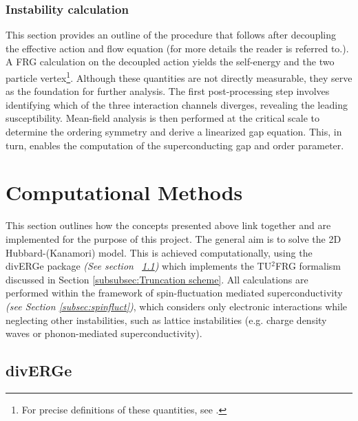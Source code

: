 \documentclass[12pt]{article}
\begin{document}
\medskip





\subsubsection{Instability calculation}

This section provides an outline of the procedure that follows after decoupling the effective action and flow equation (for more details the reader is referred to\cite{profe2023functional}.). 
A FRG calculation on the decoupled action yields the self-energy and the two particle vertex\footnote{For precise definitions of these quantities, see \cite{metzner2012functional}.}.
Although these quantities are not directly measurable, they serve as the foundation for further analysis. The first post-processing step involves
identifying which of the three interaction channels diverges, revealing the leading susceptibility. Mean-field analysis is then performed at the critical scale to determine the ordering symmetry 
and derive a linearized gap equation. This, in turn, enables the computation of 
the superconducting gap and order parameter.


\section{Computational Methods}

This section outlines how the concepts presented above link together and are implemented for the purpose of this project. 
The general aim is to solve the 2D Hubbard-(Kanamori) model. This is achieved computationally, using the divERGe package \textit{(See section ~\ref{subsec:diverge})} which implements the TU$^2$FRG
formalism discussed in Section \ref{subsubsec:Truncation scheme}.
All calculations are performed within the framework of spin-fluctuation mediated 
superconductivity \textit{(see Section \ref{subsec:spinfluct})}, which considers only 
electronic interactions while neglecting other instabilities, such as lattice 
instabilities (e.g. charge density waves or phonon-mediated superconductivity). 



\subsection{divERGe}
\label{subsec:diverge}
\end{document}
